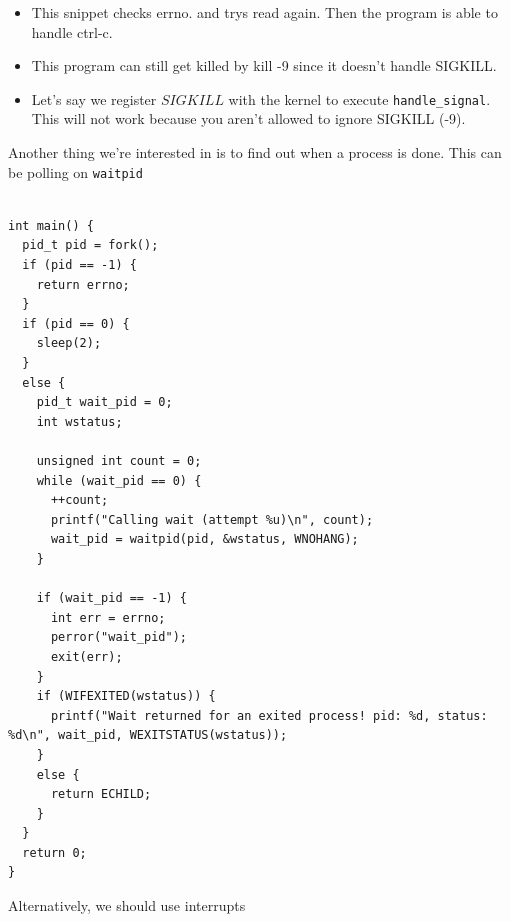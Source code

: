 \documentclass[../notes.tex]{subfiles}
\begin{document}
\begin{itemize}
    \item This snippet checks errno. and trys read again. Then the program is able to handle ctrl-c.
    \item This program can still get killed by kill -9 since it doesn't handle SIGKILL.
    \item Let's say we register $ SIGKILL $ with the kernel to execute \texttt{handle\_signal}. This will not work because you aren't allowed to ignore SIGKILL (-9).
\end{itemize}


Another thing we're interested in is to find out when a process is done. This can be polling on \texttt{waitpid}

\begin{listing}[H]
\begin{verbatim}

int main() {
  pid_t pid = fork();
  if (pid == -1) {
    return errno;
  }
  if (pid == 0) {
    sleep(2);
  }
  else {
    pid_t wait_pid = 0;
    int wstatus;

    unsigned int count = 0;
    while (wait_pid == 0) {
      ++count;
      printf("Calling wait (attempt %u)\n", count);
      wait_pid = waitpid(pid, &wstatus, WNOHANG);
    }

    if (wait_pid == -1) {
      int err = errno;
      perror("wait_pid");
      exit(err);
    }
    if (WIFEXITED(wstatus)) {
      printf("Wait returned for an exited process! pid: %d, status: %d\n", wait_pid, WEXITSTATUS(wstatus));
    }
    else {
      return ECHILD;
    }
  }
  return 0;
}
\end{verbatim}
\end{listing}

Alternatively, we should use interrupts
\end{document}
